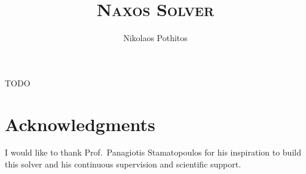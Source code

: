 \documentclass[a4paper]{article}
\begin{document}
\title{\textsc{Naxos Solver}}

\author{Nikolaos Pothitos}


\date{}

\maketitle

\noindent
TODO

\section*{Acknowledgments}

I would like to thank Prof.\ Panagiotis Stamatopoulos for
his inspiration to build this solver and his continuous
supervision and scientific support.

\nocite{*}


\end{document}
